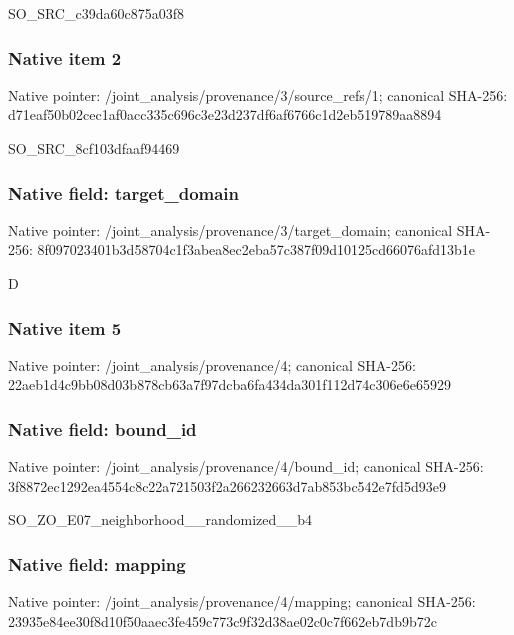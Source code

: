 \documentclass[10pt,a4paper]{article}
\begin{document}
\begingroup\raggedright\sloppy SO\_\allowbreak{}SRC\_\allowbreak{}c39da60c875a03f8\par\endgroup

\subsubsection{Native item 2}
Native pointer: /joint\_\allowbreak{}analysis/provenance/3/source\_\allowbreak{}refs/1; canonical SHA-256: d71eaf50b02cec1af0acc335c696c3e23d237df6af6766c1d2eb519789aa8894

\begingroup\raggedright\sloppy SO\_\allowbreak{}SRC\_\allowbreak{}8cf103dfaaf94469\par\endgroup

\subsubsection{Native field: target\_\allowbreak{}domain}
Native pointer: /joint\_\allowbreak{}analysis/provenance/3/target\_\allowbreak{}domain; canonical SHA-256: 8f097023401b3d58704c1f3abea8ec2eba57c387f09d10125cd66076afd13b1e

\begingroup\raggedright\sloppy D\par\endgroup

\subsubsection{Native item 5}
Native pointer: /joint\_\allowbreak{}analysis/provenance/4; canonical SHA-256: 22aeb1d4c9bb08d03b878cb63a7f97dcba6fa434da301f112d74c306e6e65929

\subsubsection{Native field: bound\_\allowbreak{}id}
Native pointer: /joint\_\allowbreak{}analysis/provenance/4/bound\_\allowbreak{}id; canonical SHA-256: 3f8872ec1292ea4554c8c22a721503f2a266232663d7ab853bc542e7fd5d93e9

\begingroup\raggedright\sloppy SO\_\allowbreak{}ZO\_\allowbreak{}E07\_\allowbreak{}neighborhood\_\allowbreak{}\_\allowbreak{}randomized\_\allowbreak{}\_\allowbreak{}b4\par\endgroup

\subsubsection{Native field: mapping}
Native pointer: /joint\_\allowbreak{}analysis/provenance/4/mapping; canonical SHA-256: 23935e84ee30f8d10f50aaec3fe459c773c9f32d38ae02c0c7f662eb7db9b72c
\end{document}
